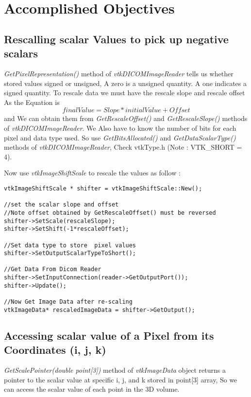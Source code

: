 \documentclass[10pt, b5paper]{article}
\begin{document}
\section{Accomplished Objectives}
\subsection{Rescalling scalar Values to pick up negative scalars}
\textit{GetPixelRepresentation()} method of \textit{vtkDICOMImageReader} tells us whether stored values signed or unsigned, A zero is a unsigned quantity. A one indicates a signed quantity.
To rescale data we must have the rescale slope and rescale offset As the Equation is 
\begin{equation}
final Value = Slope* initial Value + Offset 
\end{equation}
and We can obtain them from \textit{GetRescaleOffset()} and \textit{GetRescaleSlope()} methods of \textit{vtkDICOMImageReader}. 
We Also have to know the number of bits for each pixel and data type used. So use \textit{GetBitsAllocated()} and  \textit{GetDataScalarType()} methods of \textit{vtkDICOMImageReader}, Check vtkType.h (Note : VTK\_SHORT = 4).

Now use \textit{vtkImageShiftScale} to rescale the values  as follow :

\begin{lstlisting}
vtkImageShiftScale * shifter = vtkImageShiftScale::New();

//set the scalar slope and offset     
//Note offset obtained by GetRescaleOffset() must be reversed      
shifter->SetScale(rescaleSlope);
shifter->SetShift(-1*rescaleOffset);
    
//Set data type to store  pixel values
shifter->SetOutputScalarTypeToShort();
       
//Get Data From Dicom Reader     
shifter->SetInputConnection(reader->GetOutputPort());
shifter->Update();

//Now Get Image Data after re-scaling    
vtkImageData* rescaledImageData = shifter->GetOutput();

\end{lstlisting}

\subsection{Accessing scalar value of a Pixel from its Coordinates (i, j, k)}
\textit{GetScalePointer(double point[3])} method of \textit{vtkImageData} object returns a pointer to the scalar value at specific i, j, and k stored in point[3] array, So we can access the scalar value of each point in the 3D volume.
\end{document}
